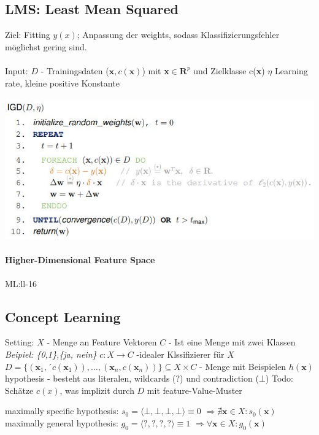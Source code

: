 \documentclass[11pt,a4paper]{article}
\begin{document}
\begin{flushleft}
\subsection{LMS: Least Mean Squared}
Ziel: Fitting $y(x)$; Anpassung der weights, sodass Klassifizierungsfehler möglichst gering sind. \\~\\
Input: $D$ - Trainingsdaten ($\mathbf{x},c(\mathbf{x})$) mit \textbf{x}$\in \textbf{R}^p$ und Zielklasse c(\textbf{x}) 
    $\eta$ Learning rate, kleine positive Konstante
    \\~\\
\includegraphics[width=\textwidth]{IGD}

\paragraph{Higher-Dimensional Feature Space} ML:ll-16


\subsection{Concept Learning}
Setting:\newline
$X$ - Menge an Feature Vektoren\newline
$C$ - Ist eine Menge mit zwei Klassen \textit{Beipiel: \{0,1\},\{ja, nein\}} \newline
$c: X \rightarrow C$ -idealer Klssifizierer für $X$ \newline
$D=\{(\mathbf{x}_1,´c(\mathbf{x}_1)),\dots,(\mathbf{x}_n,c(\mathbf{x}_n))\} \subseteq X \times C$ - Menge mit Beispielen \newline
$h(\textbf{x})$ hypothesis - besteht aus literalen, wildcards (?) und contradiction ($\bot$) \newline
Todo: \newline
Schätze $c(x)$, was implizit durch $D$ mit feature-Value-Muster

maximally specific hypothesis: $s_0 = \langle \bot,\bot, \bot, \bot \rangle \equiv 0 $
$\Rightarrow \nexists \textbf{x} \in X :  s_0(\textbf{x})$
maximally general hypothesis: $g_0 = \langle ?, ?, ?, ? \rangle \equiv 1 $
$\Rightarrow \forall \textbf{x} \in X : g_0(\textbf{x})  $



\end{flushleft}
\end{document}
